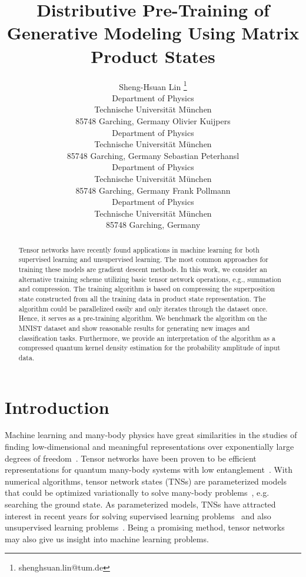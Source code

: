 \documentclass[nonatbib]{article}
\title{Distributive Pre-Training of Generative Modeling Using Matrix Product States}
\author{%
  Sheng-Hsuan Lin \thanks{shenghsuan.lin@tum.de}
  \\
  Department of Physics\\
  Technische Universit{\"a}t M{\"u}nchen\\
  85748 Garching, Germany
  \And
  Olivier Kuijpers \\
  Department of Physics\\
  Technische Universit{\"a}t M{\"u}nchen\\
  85748 Garching, Germany
   \AND
   Sebastian Peterhansl  \\
  Department of Physics\\
  Technische Universit{\"a}t M{\"u}nchen\\
  85748 Garching, Germany
   \And
   Frank Pollmann\\
  Department of Physics\\
  Technische Universit{\"a}t M{\"u}nchen\\
  85748 Garching, Germany
}
\newcommand{\citep}{\cite}
\begin{document}
\maketitle

\begin{abstract}
Tensor networks have recently found applications in machine learning for both supervised learning and unsupervised learning.
The most common approaches for training these models are gradient descent methods.
In this work, we consider an alternative training scheme utilizing basic tensor network operations, e.g., summation and compression.
The training algorithm is based on compressing the superposition state constructed from all the training data in product state representation.
The algorithm could be parallelized easily and only iterates through the dataset once. Hence, it serves as a pre-training algorithm.
We benchmark the algorithm on the MNIST dataset and show reasonable results for generating new images and classification tasks.
Furthermore, we provide an interpretation of the algorithm as a compressed quantum kernel density estimation for the probability amplitude of input data.
\end{abstract}













\section{\label{sec: Intro} Introduction}

Machine learning and many-body physics have great similarities in the studies of finding low-dimensional and meaningful representations over exponentially large degrees of freedom~\citep{bengio2013representation,goodfellow2016deep}.
Tensor networks have been proven to be efficient representations for quantum many-body systems with low entanglement~\citep{hastings2007area,eisert2010colloquium}.
With numerical algorithms, tensor network states (TNSs) are parameterized models that could be optimized variationally to solve many-body problems~\citep{schollwock2011density,bridgeman2017hand}, e.g. searching the ground state.
As parameterized models, TNSs have attracted interest in recent years for solving supervised learning problems~\citep{stoudenmire2016supervised} and also unsupervised learning problems~\citep{PhysRevX.8.031012}.
Being a promising method, tensor networks may also give us insight into machine learning problems. 
    
\end{document}
